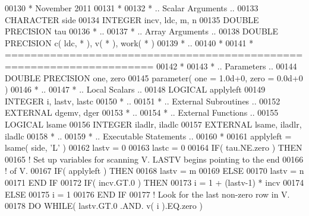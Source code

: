 \begin{DoxyCode}
00130 \textcolor{comment}{*     November 2011}
00131 \textcolor{comment}{*}
00132 \textcolor{comment}{*     .. Scalar Arguments ..}
00133       \textcolor{keywordtype}{CHARACTER}          side
00134       \textcolor{keywordtype}{INTEGER}            incv, ldc, m, n
00135       \textcolor{keywordtype}{DOUBLE PRECISION}   tau
00136 \textcolor{comment}{*     ..}
00137 \textcolor{comment}{*     .. Array Arguments ..}
00138       \textcolor{keywordtype}{DOUBLE PRECISION}   c( ldc, * ), v( * ), work( * )
00139 \textcolor{comment}{*     ..}
00140 \textcolor{comment}{*}
00141 \textcolor{comment}{*  =====================================================================}
00142 \textcolor{comment}{*}
00143 \textcolor{comment}{*     .. Parameters ..}
00144       \textcolor{keywordtype}{DOUBLE PRECISION}   one, zero
00145       parameter( one = 1.0d+0, zero = 0.0d+0 )
00146 \textcolor{comment}{*     ..}
00147 \textcolor{comment}{*     .. Local Scalars ..}
00148       \textcolor{keywordtype}{LOGICAL}            applyleft
00149       \textcolor{keywordtype}{INTEGER}            i, lastv, lastc
00150 \textcolor{comment}{*     ..}
00151 \textcolor{comment}{*     .. External Subroutines ..}
00152       \textcolor{keywordtype}{EXTERNAL}           dgemv, dger
00153 \textcolor{comment}{*     ..}
00154 \textcolor{comment}{*     .. External Functions ..}
00155       \textcolor{keywordtype}{LOGICAL}            lsame
00156       \textcolor{keywordtype}{INTEGER}            iladlr, iladlc
00157       \textcolor{keywordtype}{EXTERNAL}           lsame, iladlr, iladlc
00158 \textcolor{comment}{*     ..}
00159 \textcolor{comment}{*     .. Executable Statements ..}
00160 \textcolor{comment}{*}
00161       applyleft = lsame( side, \textcolor{stringliteral}{'L'} )
00162       lastv = 0
00163       lastc = 0
00164       \textcolor{keywordflow}{IF}( tau.NE.zero ) \textcolor{keywordflow}{THEN}
00165 \textcolor{comment}{!     Set up variables for scanning V.  LASTV begins pointing to the end}
00166 \textcolor{comment}{!     of V.}
00167          \textcolor{keywordflow}{IF}( applyleft ) \textcolor{keywordflow}{THEN}
00168             lastv = m
00169          \textcolor{keywordflow}{ELSE}
00170             lastv = n
00171 \textcolor{keywordflow}{         END IF}
00172          \textcolor{keywordflow}{IF}( incv.GT.0 ) \textcolor{keywordflow}{THEN}
00173             i = 1 + (lastv-1) * incv
00174          \textcolor{keywordflow}{ELSE}
00175             i = 1
00176 \textcolor{keywordflow}{         END IF}
00177 \textcolor{comment}{!     Look for the last non-zero row in V.}
00178          \textcolor{keywordflow}{DO} \textcolor{keywordflow}{WHILE}( lastv.GT.0 .AND. v( i ).EQ.zero )

\end{DoxyCode}
